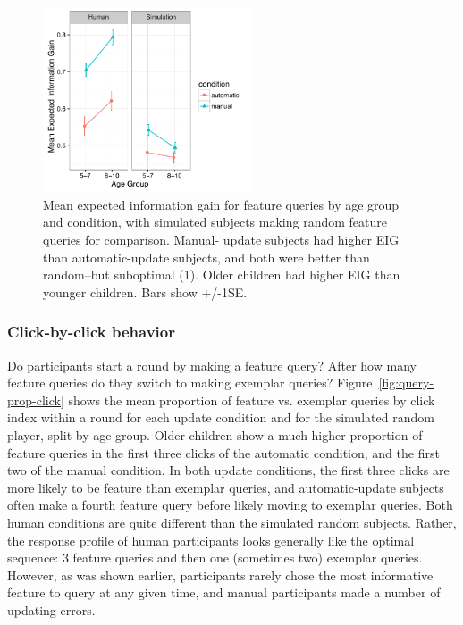 \documentclass[man,floatsintext]{apa6}
\begin{document}
\begin{figure}[t]
  \centering
  \includegraphics[width=0.55\textwidth]{figures/EIG_by_ageGroup_n_condition_with_random_sims}
  \caption{Mean expected information gain for feature queries by age group and condition, 
with simulated subjects making random feature queries for comparison. Manual-
update subjects had higher EIG than automatic-update subjects, and both were 
better than random--but suboptimal (1). Older children had higher EIG than younger children. Bars show +/-1SE.}
  \label{fig:EIG_by_age}
\end{figure} 

\subsubsection{Click-by-click behavior}

Do participants start a round by making a feature query? After how many feature 
queries do they switch to making exemplar queries? Figure~\ref{fig:query-prop-click} shows the mean proportion of feature vs. exemplar queries by click index within a round for each update condition and for the simulated random player, split by age group. Older children show a much higher proportion of feature queries in the first three clicks of the automatic condition, and the first two of the manual condition. In both update conditions, the first three clicks are more likely to be feature than exemplar queries, and automatic-update subjects often make a fourth feature query before likely moving to exemplar queries. Both human 
conditions are quite different than the simulated random subjects. Rather, the response profile of human participants looks generally like the optimal sequence: 3 feature queries and then one (sometimes two) exemplar queries. However, as was shown earlier, participants rarely chose the most informative feature to query at any given time, and manual participants made a number of updating errors. 
\end{document}
